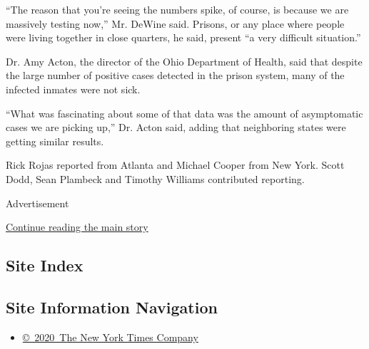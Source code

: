 ``The reason that you're seeing the numbers spike, of course, is because
we are massively testing now,'' Mr. DeWine said. Prisons, or any place
where people were living together in close quarters, he said, present
``a very difficult situation.''

Dr. Amy Acton, the director of the Ohio Department of Health, said that
despite the large number of positive cases detected in the prison
system, many of the infected inmates were not sick.

``What was fascinating about some of that data was the amount of
asymptomatic cases we are picking up,'' Dr. Acton said, adding that
neighboring states were getting similar results.

Rick Rojas reported from Atlanta and Michael Cooper from New York. Scott
Dodd, Sean Plambeck and Timothy Williams contributed reporting.

Advertisement

\protect\hyperlink{after-bottom}{Continue reading the main story}

\hypertarget{site-index}{%
\subsection{Site Index}\label{site-index}}

\hypertarget{site-information-navigation}{%
\subsection{Site Information
Navigation}\label{site-information-navigation}}

\begin{itemize}
\tightlist
\item
  \href{https://help.nytimes3xbfgragh.onion/hc/en-us/articles/115014792127-Copyright-notice}{©~2020~The
  New York Times Company}
\end{itemize}

